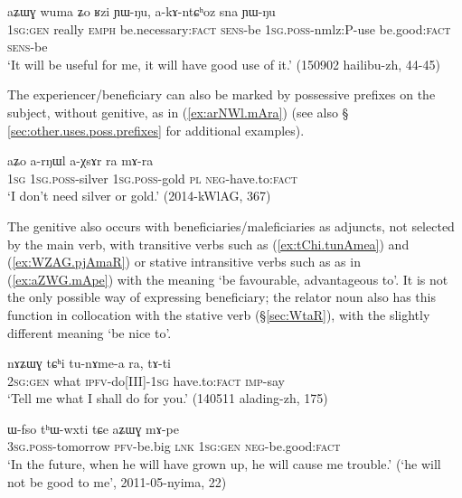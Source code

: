 \begin{exe}
\ex \label{ex:aZWG.Rzi}
 \gll aʑɯɣ wuma ʑo ʁzi ɲɯ-ŋu, a-kɤ-ntɕʰoz sna ɲɯ-ŋu \\
  \textsc{1sg:gen} really \textsc{emph} be.necessary:\textsc{fact} \textsc{sens}-be \textsc{1sg}.\textsc{poss}-nmlz:P-use be.good:\textsc{fact}  \textsc{sens}-be \\
  \glt `It will be useful for me, it will have good use of it.'  (150902 hailibu-zh, 44-45)
\end{exe}

The experiencer/beneficiary can also be marked by possessive prefixes on the subject, without genitive, as in 
(\ref{ex:arNWl.mAra}) (see also § \ref{sec:other.uses.poss.prefixes} for additional examples).

\begin{exe}
\ex \label{ex:arNWl.mAra}
 \gll aʑo a-rŋɯl a-χsɤr ra mɤ-ra \\
 \textsc{1sg} \textsc{1sg}.\textsc{poss}-silver \textsc{1sg}.\textsc{poss}-gold \textsc{pl} \textsc{neg}-have.to:\textsc{fact} \\
 \glt `I don't  need silver or gold.' (2014-kWlAG, 367)
\end{exe}

The genitive also occurs with beneficiaries/maleficiaries as adjuncts, not selected by the main verb, with transitive verbs such as  (\ref{ex:tChi.tunAmea}) and  (\ref{ex:WZAG.pjAmaR}) or stative intransitive verbs such as  as in (\ref{ex:aZWG.mApe}) with the meaning `be favourable, advantageous to'.  It is not the only possible way of expressing beneficiary; the relator noun  also has this function in collocation with the stative verb  (§\ref{sec:WtaR}), with the slightly different meaning `be nice to'.

\begin{exe}
\ex \label{ex:tChi.tunAmea}
\gll nɤʑɯɣ tɕʰi tu-nɤme-a ra, tɤ-ti  \\
\textsc{2sg}:\textsc{gen} what \textsc{ipfv}-do[III]-\textsc{1sg} have.to:\textsc{fact} \textsc{imp}-say \\
\glt `Tell me what I shall do for you.' (140511 alading-zh, 175)
\end{exe}

\begin{exe}
\ex \label{ex:aZWG.mApe}
\gll  ɯ-fso tʰɯ-wxti tɕe aʑɯɣ mɤ-pe \\ 
\textsc{3sg}.\textsc{poss}-tomorrow \textsc{pfv}-be.big \textsc{lnk} \textsc{1sg}:\textsc{gen} \textsc{neg}-be.good:\textsc{fact} \\
\glt `In the future, when he will have grown up, he will cause me trouble.' (`he will not be good to me', 2011-05-nyima, 22)
\end{exe}


